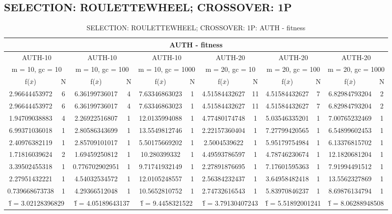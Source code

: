 \subsection{SELECTION: ROULETTEWHEEL; CROSSOVER: 1P}
\begin{table}[H]
	\centering
	\caption{SELECTION: ROULETTEWHEEL; CROSSOVER: 1P: AUTH - fitness}
	\begin{adjustbox}{width=1\textwidth}
		\begin{tabular}{ |c|c||c|c||c|c||c|c||c|c||c|c| }
			\hline
			\multicolumn{12}{|c|}{AUTH - fitness} \\
			\hline
			\multicolumn{2}{|c||}{AUTH-10} & \multicolumn{2}{c||}{AUTH-10} & \multicolumn{2}{c||}{AUTH-10} & \multicolumn{2}{c||}{AUTH-20} & \multicolumn{2}{c||}{AUTH-20} & \multicolumn{2}{c|}{AUTH-20}\\
			\hline
			\multicolumn{2}{|c||}{m = 10, gc = 10} & \multicolumn{2}{c||}{m = 10, gc = 100} & \multicolumn{2}{c||}{m = 10, gc = 1000} & \multicolumn{2}{c||}{m = 20, gc = 10} & \multicolumn{2}{c||}{m = 20, gc = 100} & \multicolumn{2}{c|}{m = 20, gc = 1000}\\
			\hline
			f($\bar{x}$) & N & f($\bar{x}$) & N & f($\bar{x}$) & N & f($\bar{x}$) & N & f($\bar{x}$) & N & f($\bar{x}$) & N\\
			\hline
			\hline
			2.96644453972 & 6 & 6.36199736017 & 4 & 7.63346863023 & 1 & 4.51584432627 & 11 & 4.51584432627 & 7 & 6.82984793204 & 2\\
			\hline
			2.96644453972 & 6 & 6.36199736017 & 4 & 7.63346863023 & 1 & 4.51584432627 & 11 & 4.51584432627 & 7 & 6.82984793204 & 2\\
			1.94709038883 & 4 & 2.26922516807 & 1 & 12.0135994088 & 1 & 4.77480174748 & 1 & 5.03546335201 & 1 & 7.00765232469 & 1\\
			6.99371036018 & 1 & 2.80586343699 & 1 & 13.5549812746 & 1 & 2.22157360404 & 1 & 7.27799420565 & 1 & 6.54899602453 & 1\\
			2.40976382119 & 1 & 2.85709101017 & 1 & 5.50175669202 & 1 & 2.5004539622 & 1 & 5.95179754984 & 1 & 6.13376815702 & 1\\
			1.71816039624 & 2 & 1.69459250812 & 1 & 10.280399332 & 1 & 4.49593786597 & 1 & 4.78746230674 & 1 & 12.1820681204 & 1\\
			3.39502455318 & 1 & 0.776702902951 & 1 & 9.71741932149 & 1 & 2.27891876695 & 1 & 7.17601595363 & 1 & 7.91994491512 & 1\\
			2.27951432221 & 1 & 4.54032534572 & 1 & 12.0105248557 & 1 & 2.56384232437 & 1 & 3.64958482418 & 1 & 13.5562327869 & 1\\
			0.739668673738 & 1 & 4.29366512048 & 1 & 10.5652810752 & 1 & 2.74732616543 & 1 & 5.83970846237 & 1 & 8.69876134794 & 1\\
			\hline
			\multicolumn{2}{|c||}{\^{f} = 3.02128396829} & \multicolumn{2}{c||}{\^{f} = 4.05189643137} & \multicolumn{2}{c||}{\^{f} = 9.4458321522} & \multicolumn{2}{c||}{\^{f} = 3.79130407243} & \multicolumn{2}{c||}{\^{f} = 5.51892001241} & \multicolumn{2}{c|}{\^{f} = 8.06288948508}\\
			\hline
		\end{tabular}
	\end{adjustbox}
\end{table}
